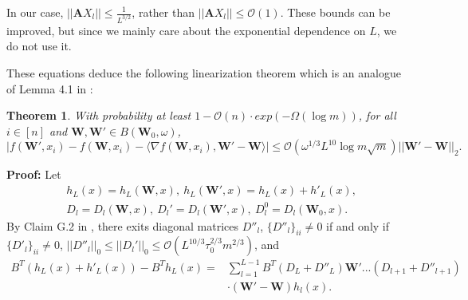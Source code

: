 \documentclass{article}
\newcommand{\cO}{\mathcal{O}}
\newtheorem{theo}{\textbf{Theorem}}
\begin{document}
In our case, $||\bm{A}X_l||\leq \frac{1}{L^{3/2}}$, rather than  $||\bm{A}X_l||\leq \cO(1)$. These bounds can be improved, but since we mainly care about the exponential dependence on $L$, we do not use it.

These equations deduce the following linearization theorem which is an analogue of Lemma 4.1 in \cite{cao}:
\begin{theo}\label{lf}
With probability at least $1-\cO(n)\cdot exp(-\Omega(\log m))$, for all $i\in [n]$ and $\bm{W},\bm{W}'\in B(\bm{W}_0,\omega)$,
\begin{equation}
|f(\bm{W}',x_i)-f(\bm{W},x_i)-\langle \nabla f(\bm{W},x_i), \bm{W}'-\bm{W}\rangle |\leq \cO(\omega^{1/3}L^{10}\log m \sqrt{m})||\bm{W}'-\bm{W}||_2.
\end{equation}
\end{theo}
{\bf Proof:}
Let
\begin{equation}
\begin{aligned}
&h_L(x)=h_L(\bm{W},x),\  h_L(\bm{W'},x)=h_L(x)+h'_L(x),\\
&D_l=D_l(\bm{W},x),\ D_l'=D_l(\bm{W}',x), \ D^0_l=D_l(\bm{W}_0,x).
\end{aligned}
\end{equation}
By Claim G.2 in \cite{rate}, there exits diagonal matrices $D''_l$, $\{D''_l\}_{ii}\neq 0$ if and only if $ \{D'_l\}_{ii}\neq 0$, $||D''_l||_0\leq ||D_l'||_0\leq \cO(L^{10/3}\tau_0^{2/3}m^{2/3})$, and
\begin{equation}
\begin{aligned}
B^T(h_L(x)+h'_L(x))-B^Th_L(x)=&\sum_{l=1}^{L-1}B^T(D_L+D''_L)\bm{W}'...(D_{l+1}+D''_{l+1})\\
&\cdot (\bm{W}'-\bm{W})h_l(x).
\end{aligned}
\end{equation}
\end{document}
